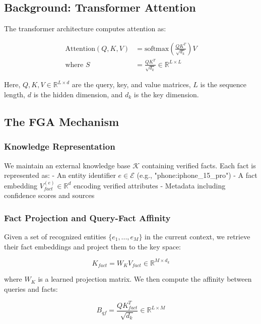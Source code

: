 \documentclass[11pt, a4paper]{article}
\theoremstyle{definition}
\newcommand{\R}{\mathbb{R}}
\newcommand{\softmax}{\text{softmax}}
\begin{document}
\subsection{Background: Transformer Attention}

The transformer architecture \cite{vaswani2017attention} computes attention as:

\begin{align}
\text{Attention}(Q, K, V) &= \softmax\left(\frac{QK^T}{\sqrt{d_k}}\right)V \\
\text{where } S &= \frac{QK^T}{\sqrt{d_k}} \in \R^{L \times L}
\end{align}

Here, $Q, K, V \in \R^{L \times d}$ are the query, key, and value matrices, $L$ is the sequence length, $d$ is the hidden dimension, and $d_k$ is the key dimension.

\subsection{The FGA Mechanism}

\subsubsection{Knowledge Representation}

We maintain an external knowledge base $\mathcal{K}$ containing verified facts. Each fact is represented as:
- An entity identifier $e \in \mathcal{E}$ (e.g., "phone:iphone\_15\_pro")
- A fact embedding $V_{fact}^{(e)} \in \R^{d}$ encoding verified attributes
- Metadata including confidence scores and sources

\subsubsection{Fact Projection and Query-Fact Affinity}

Given a set of recognized entities $\{e_1, ..., e_M\}$ in the current context, we retrieve their fact embeddings and project them to the key space:

\begin{equation}
K_{fact} = W_K V_{fact} \in \R^{M \times d_k}
\end{equation}

where $W_K$ is a learned projection matrix. We then compute the affinity between queries and facts:

\begin{equation}
B_{qf} = \frac{QK_{fact}^T}{\sqrt{d_k}} \in \R^{L \times M}
\end{equation}
\end{document}

